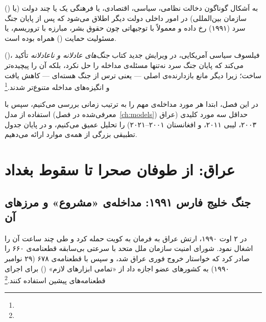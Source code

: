 \begin{tcolorbox}[defbox, title={مفهوم کلیدی: مداخله‌ی معاصر}]
 () به اَشکال گوناگون دخالت نظامی، سیاسی، اقتصادی، یا فرهنگی یک یا چند دولت (یا سازمان بین‌المللی) در امور داخلی دولت دیگر اطلاق می‌شود که پس از پایان جنگ سرد (۱۹۹۱) رخ داده و معمولاً با توجیهاتی چون حقوق بشر، مبارزه با تروریسم، یا مسئولیت حمایت () همراه بوده است.
\end{tcolorbox}

 ()، فیلسوف سیاسی آمریکایی، در ویرایش جدید کتاب \textit{جنگ‌های عادلانه و ناعادلانه} تأکید می‌کند که پایان جنگ سرد نه‌تنها مسئله‌ی مداخله را حل نکرد، بلکه آن را پیچیده‌تر ساخت؛ زیرا دیگر مانع بازدارنده‌ی اصلی — یعنی ترس از جنگ هسته‌ای — کاهش یافت و انگیزه‌های مداخله متنوع‌تر شدند.\footnote{}

در این فصل، ابتدا هر مورد مداخله‌ی مهم را به ترتیب زمانی بررسی می‌کنیم، سپس با استفاده از مدل  (معرفی‌شده در فصل~\ref{ch:models}) حداقل سه مورد کلیدی (عراق ۲۰۰۳، لیبی ۲۰۱۱، و افغانستان ۲۰۰۱–۲۰۲۱) را تحلیل عمیق می‌کنیم، و در پایان جدول تطبیقی بزرگی از همه‌ی موارد ارائه می‌دهیم.


\section{عراق: از طوفان صحرا تا سقوط بغداد}
\label{sec:ch10-iraq}

\subsection{جنگ خلیج فارس ۱۹۹۱: مداخله‌ی «مشروع» و مرزهای آن}
\label{subsec:ch10-iraq-1991}

در ۲ اوت ۱۹۹۰، ارتش عراق به فرمان  به کویت حمله کرد و طی چند ساعت آن را اشغال نمود. شورای امنیت سازمان ملل متحد با سرعتی بی‌سابقه قطعنامه‌ی ۶۶۰ را صادر کرد که خواستار خروج فوری عراق شد، و سپس با قطعنامه‌ی ۶۷۸ (۲۹ نوامبر ۱۹۹۰) به کشورهای عضو اجازه داد از «تمامی ابزارهای لازم» () برای اجرای قطعنامه‌های پیشین استفاده کنند.\footnote{}


